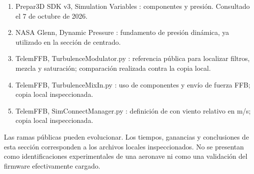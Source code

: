\begin{enumerate}
\item Prepar3D SDK v3, Simulation Variables \cite{p3dv3}: componentes  y presión. Consultado el 7 de octubre de 2026.
\item NASA Glenn, Dynamic Pressure \cite{nasaq}: fundamento de presión dinámica, ya utilizado en la sección de centrado.
\item TelemFFB, TurbulenceModulator.py \cite{telemffb}: referencia pública para localizar filtros, mezcla y saturación; comparación realizada contra la copia local.
\item TelemFFB, TurbulenceMixIn.py \cite{telemffb}: uso de componentes y envío de fuerza FFB; copia local inspeccionada.
\item TelemFFB, SimConnectManager.py \cite{telemffb}: definición de  con viento relativo en m/s; copia local inspeccionada.
\end{enumerate}
Las ramas públicas pueden evolucionar. Los tiempos, ganancias y conclusiones de esta sección corresponden a los archivos locales inspeccionados. No se presentan como identificaciones experimentales de una aeronave ni como una validación del firmware efectivamente cargado.
\newpage
